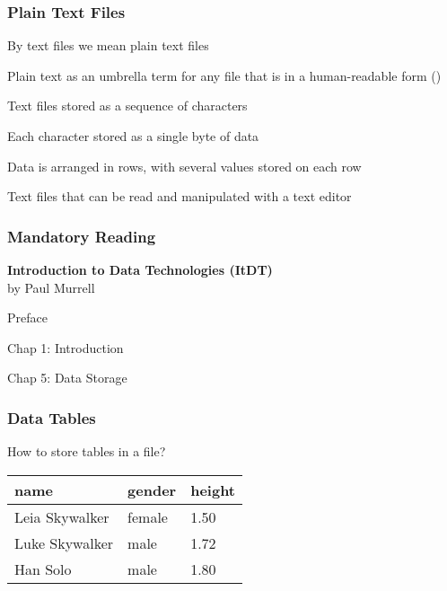 \documentclass[12pt]{beamer}\usepackage[]{graphicx}\usepackage[]{color}
\begin{document}

\begin{frame}
\frametitle{Plain Text Files}

\bi
  \item By text files we mean plain text files
  \item Plain text as an umbrella term for any file that is in a human-readable form ()
  \item Text files stored as a sequence of characters
  \item Each character stored as a single byte of data
  \item Data is arranged in rows, with several values stored on each row
  \item Text files that can be read and manipulated with a text editor
\ei

\end{frame}


\begin{frame}
\frametitle{Mandatory Reading}

{\large \textbf{Introduction to Data Technologies (ItDT)} \\
by Paul Murrell

\bigskip
{\mdlit 
\bi
  \item Preface
  \item Chap 1: Introduction
  \item Chap 5: Data Storage
\ei}
}

\end{frame}


\begin{frame}
\begin{center}
\Huge{}
\end{center}
\end{frame}


\begin{frame}[fragile]
\frametitle{Data Tables}

\begin{center}
{\Large How to store tables in a file?}

\bigskip

 \begin{tabular}{| l | l | l |}
  \hline
name & gender & height \\
  \hline
Leia Skywalker & female & 1.50 \\
  \hline
Luke Skywalker & male & 1.72 \\
  \hline
Han Solo & male & 1.80 \\
  \hline
 \end{tabular}
\end{center}

\end{frame}
\end{document}
